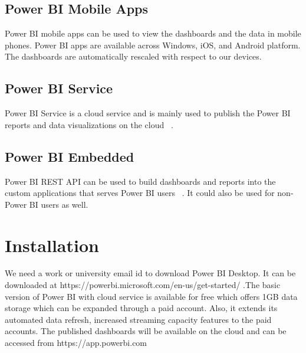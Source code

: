 \subsection{Power BI Mobile Apps}
Power BI mobile apps can be used to view the dashboards 
and the data in mobile phones. Power BI apps are available across Windows, iOS,
and Android platform. The dashboards are automatically rescaled with respect 
to our devices.

\subsection{Power BI Service}
Power BI Service is a cloud service and is mainly used to publish the 
Power BI reports and data visualizations on the cloud 
~\cite{hid-sp18-418-power bi-components}.

\subsection{Power BI Embedded}
Power BI REST API can be used to build dashboards and 
reports into the custom applications that serves Power BI users
~\cite{hid-sp18-418-power bi-components}. It could also be used for non-Power 
BI users as well.

\section{Installation}
We need a work or university email id to download Power BI Desktop. It can be 
downloaded at https://powerbi.microsoft.com/en-us/get-started/ .The basic 
version of Power BI with cloud service is available for free which offers 
1GB data storage which can be expanded through a paid account. Also, it extends
its automated data refresh, increased streaming capacity features to the paid 
accounts. The published dashboards will be available on the cloud and can be 
accessed from https://app.powerbi.com
 
